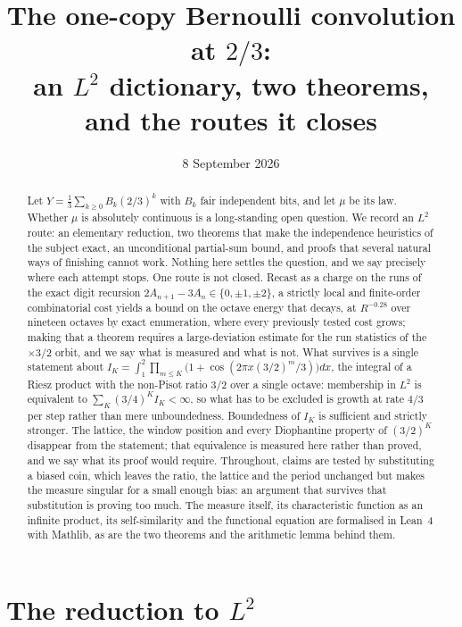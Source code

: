 \documentclass[11pt]{article}
\title{The one-copy Bernoulli convolution at $2/3$:\\ an $L^2$ dictionary, two theorems, and the routes it closes}
\date{8 September 2026}
\theoremstyle{remark}
\begin{document}
\maketitle

\begin{abstract}
Let $Y=\tfrac13\sum_{k\ge0}B_k(2/3)^k$ with $B_k$ fair independent bits, and let $\mu$ be its law.
Whether $\mu$ is absolutely continuous is a long-standing open question. We record an $L^2$ route: an
elementary reduction, two theorems that make the independence heuristics of the subject exact, an
unconditional partial-sum bound, and proofs that several natural ways of finishing cannot work. Nothing
here settles the question, and we say precisely where each attempt stops. One route is not closed. Recast as a charge on the runs of the exact digit
recursion $2A_{n+1}-3A_n\in\{0,\pm1,\pm2\}$, a strictly local and finite-order combinatorial cost yields
a bound on the octave energy that decays, at $R^{-0.28}$ over nineteen octaves by exact enumeration,
where every previously tested cost grows; making that a theorem requires a large-deviation estimate for
the run statistics of the $\times3/2$ orbit, and we say what is measured and what is not. What survives is a single
statement about $I_K=\int_1^2\prod_{m\le K}\bigl(1+\cos(2\pi x(3/2)^m/3)\bigr)dx$, the integral of a
Riesz product with the non-Pisot ratio $3/2$ over a single octave: membership in $L^2$ is equivalent to
$\sum_K(3/4)^KI_K<\infty$, so what has to be excluded is growth at rate $4/3$ per step rather than mere
unboundedness. Boundedness of $I_K$ is sufficient and strictly stronger. The lattice, the window position and
every Diophantine property of $(3/2)^K$ disappear from the statement; that equivalence is measured here
rather than proved, and we say what its proof would require. Throughout, claims are tested by substituting a biased coin, which leaves the ratio, the lattice
and the period unchanged but makes the measure singular for a small enough bias: an argument that
survives that substitution is proving too much. The measure itself, its characteristic function as an
infinite product, its self-similarity and the functional equation are formalised in Lean~4 with Mathlib,
as are the two theorems and the arithmetic lemma behind them.
\end{abstract}

\section{The reduction to $L^2$}
\end{document}

